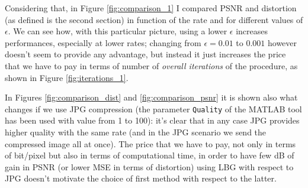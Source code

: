 \documentclass{report}
\def\code#1{\texttt{#1}}
\begin{document}
Considering that, in Figure \ref{fig:comparison_1} I compared PSNR and distortion (as defined is the second section) in function of the rate and for different values of $\epsilon$. We can see how, with this particular picture, using a lower $\epsilon$ increases performances, especially at lower rates; changing from $\epsilon = 0.01$ to $0.001$ however doesn't seem to provide any advantage, but instead it just increases the price that we have to pay in terms of number of \textit{overall iterations} of the procedure, as shown in Figure \ref{fig:iterations_1}. 

In Figures \ref{fig:comparison_dist} and \ref{fig:comparison_psnr} it is shown also what changes if we use JPG compression \cite{jpeg} (the parameter \code{Quality} of the MATLAB tool has been used with value from 1 to 100): it's clear that in any case JPG provides higher quality with the same rate (and in the JPG scenario we send the compressed image all at once). The price that we have to pay, not only in terms of bit/pixel but also in terms of computational time, in order to have few dB of gain in PSNR (or lower MSE in terms of distortion) using LBG with respect to JPG doesn't motivate the choice of first method with respect to the latter.

\begin{figure}[ht]
	\centering
	\hfill
	\caption{}
\end{figure}
\end{document}
